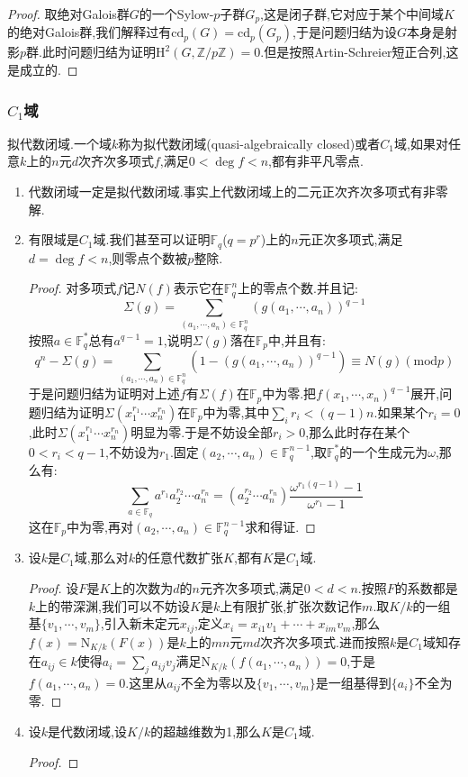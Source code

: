 \begin{enumerate}
\begin{proof}
    	取绝对Galois群$G$的一个Sylow-$p$子群$G_p$,这是闭子群,它对应于某个中间域$K$的绝对Galois群,我们解释过有$\mathrm{cd}_p(G)=\mathrm{cd}_p(G_p)$,于是问题归结为设$G$本身是射影$p$群.此时问题归结为证明$\mathrm{H}^2(G,\mathbb{Z}/p\mathbb{Z})=0$.但是按照Artin-Schreier短正合列,这是成立的.
    \end{proof}
\end{enumerate}
\subsubsection{$C_1$域}

拟代数闭域.一个域$k$称为拟代数闭域(quasi-algebraically closed)或者$C_1$域,如果对任意$k$上的$n$元$d$次齐次多项式$f$,满足$0<\deg f<n$,都有非平凡零点.
\begin{enumerate}
	\item 代数闭域一定是拟代数闭域.事实上代数闭域上的二元正次齐次多项式有非零解.
	\item 有限域是$C_1$域.我们甚至可以证明$\mathbb{F}_q$($q=p^r$)上的$n$元正次多项式,满足$d=\deg f<n$,则零点个数被$p$整除.
	\begin{proof}
		
		对多项式$f$记$N(f)$表示它在$\mathbb{F}_q^n$上的零点个数.并且记:
		$$\Sigma(g)=\sum_{(a_1,\cdots,a_n)\in\mathbb{F}_q^n}(g(a_1,\cdots,a_n))^{q-1}$$
		按照$a\in\mathbb{F}_q^*$总有$a^{q-1}=1$,说明$\Sigma(g)$落在$\mathbb{F}_p$中,并且有:
		$$q^n-\Sigma(g)=\sum_{(a_1,\cdots,a_n)\in\mathbb{F}_q^n}\left(1-(g(a_1,\cdots,a_n))^{q-1}\right)\equiv N(g)(\mathrm{mod}p)$$
		于是问题归结为证明对上述$f$有$\Sigma(f)$在$\mathbb{F}_p$中为零.把$f(x_1,\cdots,x_n)^{q-1}$展开,问题归结为证明$\Sigma(x_1^{r_1}\cdots x_n^{r_n})$在$\mathbb{F}_p$中为零,其中$\sum_ir_i<(q-1)n$.如果某个$r_i=0$,此时$\Sigma(x_1^{r_1}\cdots x_n^{r_n})$明显为零.于是不妨设全部$r_i>0$,那么此时存在某个$0<r_i<q-1$,不妨设为$r_1$.固定$(a_2,\cdots,a_n)\in\mathbb{F}_q^{n-1}$,取$\mathbb{F}_q^*$的一个生成元为$\omega$,那么有:
		$$\sum_{a\in\mathbb{F}_q}a^{r_1}a_2^{r_2}\cdots a_n^{r_n}=(a_2^{r_2}\cdots a_n^{r_n})\frac{\omega^{r_1(q-1)}-1}{\omega^{r_1}-1}$$
		这在$\mathbb{F}_p$中为零,再对$(a_2,\cdots,a_n)\in\mathbb{F}_q^{n-1}$求和得证.
	\end{proof}
    \item 设$k$是$C_1$域,那么对$k$的任意代数扩张$K$,都有$K$是$C_1$域.
    \begin{proof}
    	
    	设$F$是$K$上的次数为$d$的$n$元齐次多项式,满足$0<d<n$.按照$F$的系数都是$k$上的带深渊,我们可以不妨设$K$是$k$上有限扩张,扩张次数记作$m$.取$K/k$的一组基$\{v_1,\cdots,v_m\}$,引入新未定元$x_{ij}$,定义$x_i=x_{i1}v_1+\cdots+x_{im}v_m$,那么$f(x)=\mathrm{N}_{K/k}(F(x))$是$k$上的$mn$元$md$次齐次多项式.进而按照$k$是$C_1$域知存在$a_{ij}\in k$使得$a_i=\sum_ja_{ij}v_j$满足$\mathrm{N}_{K/k}(f(a_1,\cdots,a_n))=0$,于是$f(a_1,\cdots,a_n)=0$.这里从$a_{ij}$不全为零以及$\{v_1,\cdots,v_m\}$是一组基得到$\{a_i\}$不全为零.
    \end{proof}
    \item 设$k$是代数闭域,设$K/k$的超越维数为1,那么$K$是$C_1$域.
    \begin{proof}
    	

\end{proof}
\end{enumerate}
